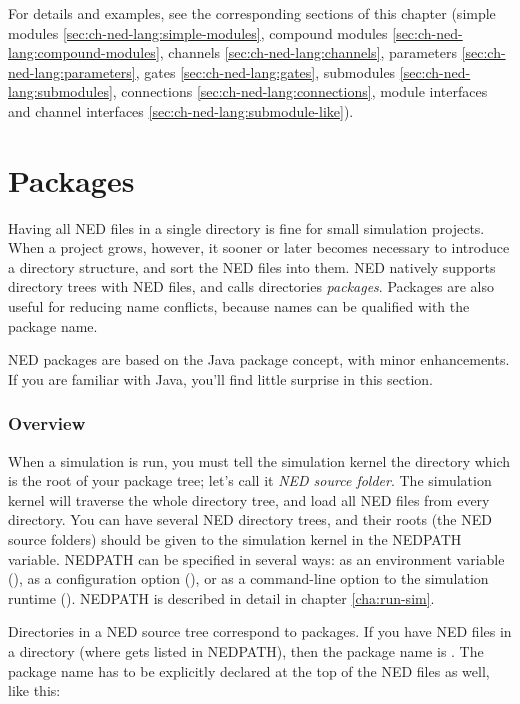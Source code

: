 For details and examples, see the corresponding sections of this chapter
(simple modules \ref{sec:ch-ned-lang:simple-modules},
compound modules \ref{sec:ch-ned-lang:compound-modules},
channels \ref{sec:ch-ned-lang:channels},
parameters \ref{sec:ch-ned-lang:parameters},
gates \ref{sec:ch-ned-lang:gates},
submodules \ref{sec:ch-ned-lang:submodules},
connections \ref{sec:ch-ned-lang:connections},
module interfaces and channel interfaces \ref{sec:ch-ned-lang:submodule-like}).



\section{Packages}
\label{sec:ch-ned-lang:packages}

Having all NED files in a single directory is fine for small simulation projects.
When a project grows, however, it sooner or later becomes
necessary to introduce a directory structure, and sort the NED files into
them. NED natively supports directory trees with NED files, and calls
directories \textit{packages}. Packages are also useful for reducing
name conflicts, because names can be qualified with the package name.

\begin{note}
    NED packages are based on the Java package concept, with minor
    enhancements. If you are familiar with Java, you'll find little
    surprise in this section.
\end{note}

\subsubsection{Overview}

When a simulation is run, you must tell the simulation kernel the
directory which is the root of your package tree; let's call it
\textit{NED source folder}. The simulation kernel will traverse
the whole directory tree, and load all NED files from every directory.
You can have several NED directory trees, and their roots (the NED source
folders) should be given to the simulation kernel in the NEDPATH
variable. NEDPATH can be specified in several ways: as an environment
variable (), as a configuration option (),
or as a command-line option to the simulation runtime (). NEDPATH is
described in detail in chapter \ref{cha:run-sim}.

Directories in a NED source tree correspond to packages. If you have
NED files in a  directory (where 
gets listed in NEDPATH), then the package name is .
The package name has to be explicitly declared at the top of the NED
files as well, like this:

